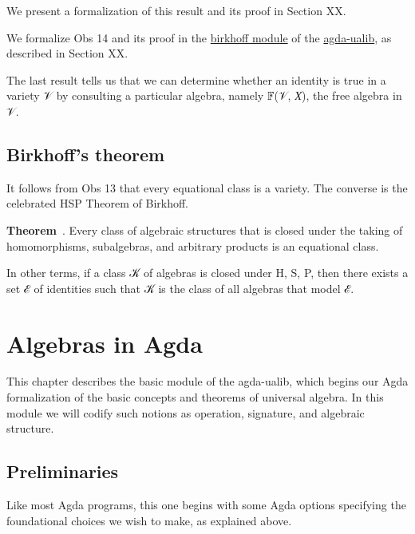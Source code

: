 \documentclass[sigplan,screen]{acmart}
\newcommand{\agdaualib}{\href{https://ualib.org}{agda-ualib}\xspace}
\newcommand\birkhoffmodule{\href{https://gitlab.com/ualib/ualib.gitlab.io/-/blob/master/birkhoff.lagda.rst}{birkhoff module}\xspace}
\begin{document}
We present a formalization of this result and its proof in Section XX. %

We formalize Obs 14 and its proof in the \birkhoffmodule of the \agdaualib, as described in Section XX. %

The last result tells us that we can determine whether an identity is true in a variety 𝒱 by consulting a particular algebra, namely 𝔽(𝒱, 𝑋), the free algebra in 𝒱.

\subsection{Birkhoff's theorem}\label{birkhoffs-theorem}
It follows from Obs 13 that every equational class is a variety. The converse is the celebrated HSP Theorem of Birkhoff.

\noindent \textbf{Theorem}~\cite{Birkhoff:1935}. Every class of algebraic structures that is closed under the taking of homomorphisms, subalgebras, and arbitrary products is an equational class.

In other terms, if a class 𝒦 of algebras is closed under H, S, P, then there exists a set ℰ of identities such that 𝒦 is the class of all algebras that model ℰ.


\section{Algebras in Agda}
This chapter describes the basic module of the agda-ualib, which begins our Agda formalization of the basic concepts and theorems of universal algebra. In this module we will codify such notions as operation, signature, and algebraic structure.

\subsection{Preliminaries}
Like most Agda programs, this one begins with some Agda options specifying the foundational choices we wish to make, as explained above.
\end{document}
